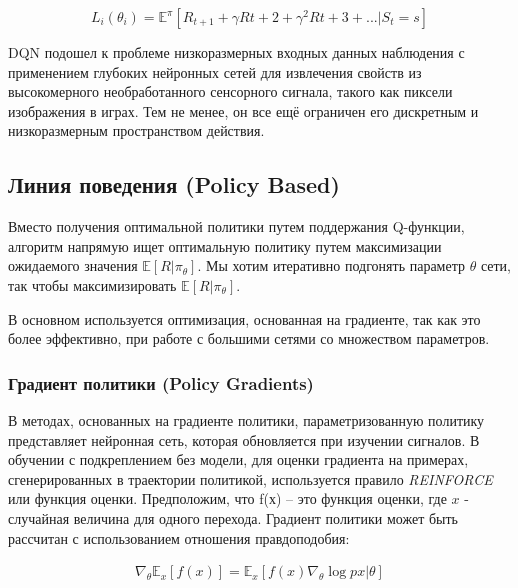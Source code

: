 \begin{equation} \label{eq:someEq}
L_i(\theta_i) = \mathbb{E}^\pi [R_{t+1} + \gamma R{t+2} + \gamma^2 R{t+3} + ... |S_t = s]
\end{equation}


DQN подошел к проблеме низкоразмерных входных данных наблюдения с применением глубоких нейронных сетей для извлечения свойств из высокомерного необработанного сенсорного сигнала, такого как пиксели изображения в играх. Тем не менее, он все ещё ограничен его дискретным и низкоразмерным пространством действия.

\subsection{Линия поведения (Policy Based)}

Вместо получения оптимальной политики путем поддержания Q-функции, алгоритм напрямую ищет оптимальную политику путем максимизации ожидаемого значения $\mathbb{E}[R|\pi_\theta]$. Мы хотим итеративно подгонять параметр $\theta$ сети, так чтобы максимизировать $\mathbb{E}[R|\pi_\theta]$.

В основном используется оптимизация, основанная на градиенте, так как это более эффективно, при работе с большими сетями со множеством параметров. \cite{Arulkumaran_2017}

\subsubsection{Градиент политики (Policy Gradients)}

В методах, основанных на градиенте политики, параметризованную политику представляет нейронная сеть, которая обновляется при изучении сигналов. В обучении с подкреплением без модели, для оценки градиента на примерах, сгенерированных в траектории политикой, используется правило {\itshape REINFORCE} или функция оценки. Предположим, что f(х) – это функция оценки, где $x$ - случайная величина для одного перехода. Градиент политики может быть рассчитан с использованием отношения правдоподобия:

\begin{equation}
	\label{eq:ch1-likelihood-ratios}
	\begin{multlined}
		\nabla_\theta \mathbb{E}_x[f(x)] = \mathbb{E}_x[f(x) \nabla_\theta \log p x|\theta]
	\end{multlined}
\end{equation}

